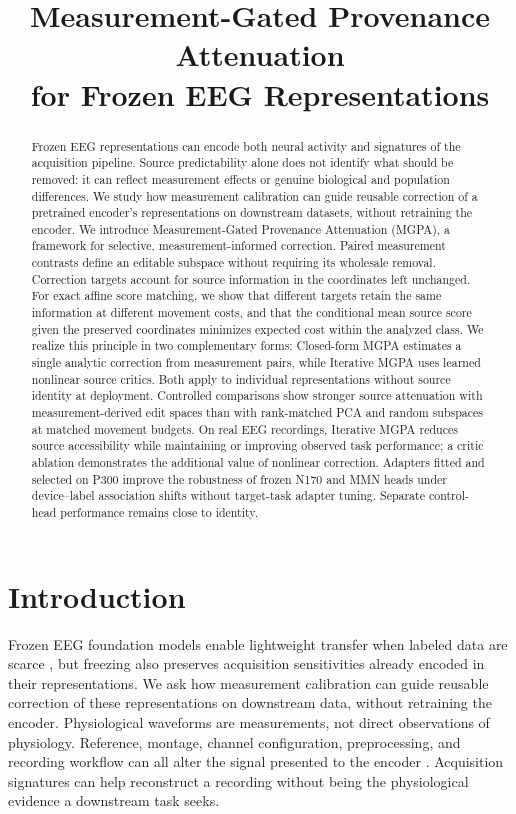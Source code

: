 \documentclass{article}
\title{Measurement-Gated Provenance Attenuation\\for Frozen EEG Representations}
\author{}
\theoremstyle{plain}
\theoremstyle{definition}
\begin{document}
\maketitle
\raggedbottom
\begin{abstract}
Frozen EEG representations can encode both neural activity and
signatures of the acquisition pipeline. Source predictability alone does not
identify what should be removed: it can reflect measurement effects or
genuine biological and population differences. We study how measurement
calibration can guide reusable correction of a pretrained encoder's
representations on downstream datasets, without retraining the encoder.
We introduce
Measurement-Gated Provenance Attenuation (MGPA), a framework for selective,
measurement-informed correction. Paired measurement contrasts define an
editable subspace without requiring its wholesale removal. Correction targets
account for source information in the coordinates left unchanged.
For exact affine score matching, we show that different
targets retain the same information at different movement costs, and that
the conditional mean source score given the preserved coordinates minimizes
expected cost within the analyzed class.
We realize this principle in two complementary forms: Closed-form MGPA
estimates a single analytic correction from measurement pairs, while
Iterative MGPA uses learned nonlinear source critics. Both apply to
individual representations without source identity at deployment. Controlled
comparisons show stronger source attenuation with measurement-derived edit
spaces than with rank-matched PCA and random subspaces at matched movement
budgets. On real EEG recordings, Iterative MGPA reduces source accessibility
while maintaining or improving observed task performance; a critic ablation
demonstrates the additional value of nonlinear correction.
Adapters fitted and selected on P300 improve the robustness of frozen N170
and MMN heads under device--label association shifts without target-task
adapter tuning. Separate control-head performance remains close to identity.
\end{abstract}
\section{Introduction}
\label{sec:introduction}
Frozen EEG foundation models enable lightweight transfer when labeled
data are scarce \citep{wang2024eegpt}, but freezing also preserves
acquisition sensitivities already encoded in their representations.
We ask how measurement calibration can guide reusable correction of these
representations on downstream data, without retraining the encoder.
Physiological waveforms are measurements, not direct observations of physiology.
Reference, montage, channel configuration, preprocessing, and recording
workflow can all alter the signal presented to the encoder
\citep{nunez2006,dong2019}. Acquisition signatures can help reconstruct
a recording without being the physiological evidence a downstream task
seeks.
\end{document}

